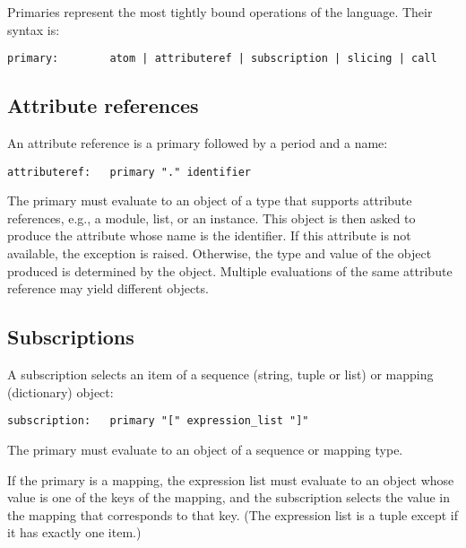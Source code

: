 Primaries represent the most tightly bound operations of the language.
Their syntax is:

\begin{verbatim}
primary:        atom | attributeref | subscription | slicing | call
\end{verbatim}

\subsection{Attribute references\label{attribute-references}}

An attribute reference is a primary followed by a period and a name:

\begin{verbatim}
attributeref:   primary "." identifier
\end{verbatim}

The primary must evaluate to an object of a type that supports
attribute references, e.g., a module, list, or an instance.  This
object is then asked to produce the attribute whose name is the
identifier.  If this attribute is not available, the exception
 is raised.
Otherwise, the type and value of the object produced is determined by
the object.  Multiple evaluations of the same attribute reference may
yield different objects.

\subsection{Subscriptions\label{subscriptions}}

A subscription selects an item of a sequence (string, tuple or list)
or mapping (dictionary) object:

\begin{verbatim}
subscription:   primary "[" expression_list "]"
\end{verbatim}

The primary must evaluate to an object of a sequence or mapping type.

If the primary is a mapping, the expression list must evaluate to an
object whose value is one of the keys of the mapping, and the
subscription selects the value in the mapping that corresponds to that
key.  (The expression list is a tuple except if it has exactly one
item.)

